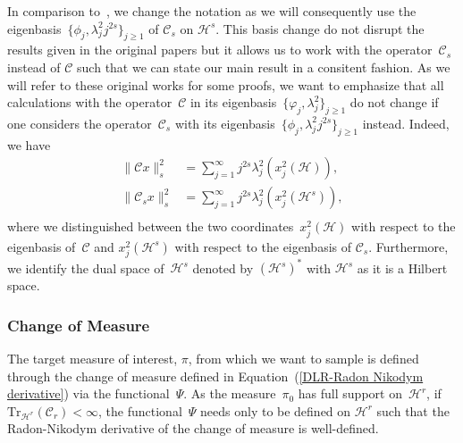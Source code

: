 \begin{rem}
  \label{DLR-Remark Change of basis}
  In comparison to~\autocite{Mattingly2010, Pillai2012}, we change the notation as we will consequently use the eigenbasis~$\{ \phi_j,  \lambda_j^2 j^{2s} \}_{j \geq 1}$ of $\mathcal{C}_s$ on $\mathcal{H}^s$. This basis change do not disrupt the results given in the original papers but it allows us to work with the operator~$\mathcal{C}_s$ instead of $\mathcal{C}$ such that we can state our main result in a consitent fashion. As we will refer to these original works for some  proofs, we want to emphasize that all calculations with the operator~$\mathcal{C}$ in its eigenbasis~$\{ \varphi_j,  \lambda_j^2 \}_{j \geq 1}$ do not change if one considers the operator~$\mathcal{C}_s$ with its eigenbasis~$\{ \phi_j,  \lambda_j^2 j^{2s} \}_{j \geq 1}$ instead. Indeed, we have
  \begin{equation}
    \begin{split}
      \| \mathcal{C}x \|_s^2 & = \sum_{j=1}^{\infty} j^{2s} \lambda_j^2 \left(x_j^2 (\mathcal{H})\right), \\
       \| \mathcal{C}_sx \|_s^2 & = \sum_{j=1}^{\infty} j^{2s} \lambda_j^2 \left(x_j^2(\mathcal{H}^s)\right),\\
    \end{split}
  \end{equation}
 where we distinguished between the two coordinates~$x_j^2 (\mathcal{H}) $ with respect to the eigenbasis of~$\mathcal{C}$ and $x_j^2(\mathcal{H}^s)$ with respect to the eigenbasis of $\mathcal{C}_s$. Furthermore, we identify the dual space of~$\mathcal{H}^s$ denoted by $(\mathcal{H}^s)^*$ with $\mathcal{H}^s$ as it is a Hilbert space.
\end{rem}




\subsubsection{Change of Measure}

The target measure of interest, $\pi$, from which we want to sample is defined through the change of measure defined in Equation~(\ref{DLR-Radon Nikodym derivative}) via the functional~$\Psi$. As the measure~$\pi_0$ has full support on~$\mathcal{H}^r$, if $\text{Tr}_{\mathcal{H}^r}(\mathcal{C}_r) < \infty$, the functional~$\Psi$ needs only to be defined on $\mathcal{H}^r$ such that the Radon-Nikodym derivative of the change of measure is well-defined.

